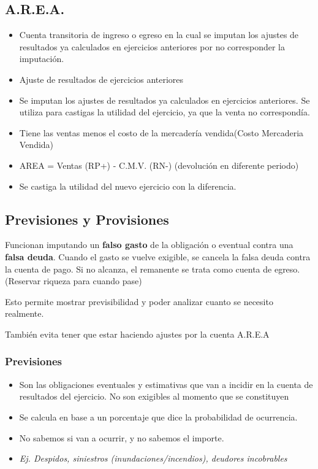 \documentclass[titlepage,a4paper]{article}
\begin{document}
\subsection*{A.R.E.A.}
\begin{itemize}
\item Cuenta transitoria de ingreso o egreso en la cual se imputan los ajustes de resultados ya calculados en ejercicios anteriores por no corresponder la imputación.
\item Ajuste de resultados de ejercicios anteriores
\item Se imputan los ajustes de resultados ya calculados en ejercicios anteriores. Se utiliza para castigas la utilidad del ejercicio, ya que la venta no correspondía.
\item Tiene las ventas menos el costo de la mercadería vendida(Costo Mercaderia Vendida)
\item AREA = Ventas (RP+) - C.M.V. (RN-) (devolución en diferente periodo)
\item Se castiga la utilidad del nuevo ejercicio con la diferencia.
\end{itemize}

\subsection*{Previsiones y Provisiones}
Funcionan imputando un\textbf{ falso gasto} de la obligación o eventual contra una \textbf{falsa deuda}. Cuando el gasto se vuelve exigible, se cancela la falsa deuda contra la cuenta de pago. Si no alcanza, el remanente se trata como cuenta de egreso. (Reservar riqueza para cuando pase)

Esto permite mostrar previsibilidad y poder analizar cuanto se necesito realmente.

También evita tener que estar haciendo ajustes por la cuenta A.R.E.A

\subsubsection*{Previsiones}

\begin{itemize}
\item Son las obligaciones eventuales y estimativas que van a incidir en la cuenta de resultados del ejercicio. No son exigibles al momento que se constituyen
\item Se calcula en base a un porcentaje que dice la probabilidad de ocurrencia.
\item No sabemos si van a ocurrir, y no sabemos el importe.
\item \textit{Ej. Despidos, siniestros (inundaciones/incendios), deudores incobrables}
\end{itemize}
\end{document}
